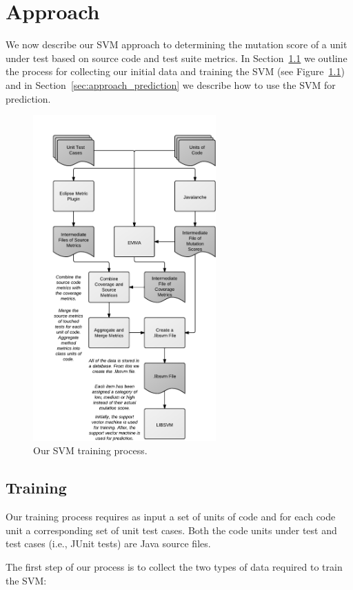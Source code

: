 \chapter{Approach}
\label{chap:approach}
We now describe our SVM approach to determining the mutation score of a unit under test based on source code and test suite metrics. In Section~\ref{sec:approach_training} we outline the process for collecting our initial data and training the SVM (see Figure~\ref{fig:process}) and in Section~\ref{sec:approach_prediction} we describe how to use the SVM for prediction.

\begin{figure}[!t]
  \centering
  \includegraphics[width=7cm]{figures/process.pdf}
  \caption{Our SVM training process.}
  \label{fig:process}
\end{figure}


\section{Training}
\label{sec:approach_training}
Our training process requires as input a set of units of code and for each code unit a corresponding set of unit test cases. Both the code units under test and test cases (i.e., JUnit tests) are Java source files.

The first step of our process is to collect the two types of data required to train the SVM:

